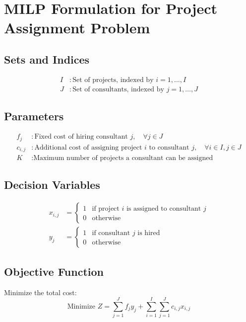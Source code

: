 \documentclass{article}
\begin{document}
\section*{MILP Formulation for Project Assignment Problem}

\subsection*{Sets and Indices}
\begin{align*}
I & : \text{Set of projects, indexed by } i = 1, \ldots, I \\
J & : \text{Set of consultants, indexed by } j = 1, \ldots, J
\end{align*}

\subsection*{Parameters}
\begin{align*}
f_j & : \text{Fixed cost of hiring consultant } j, \quad \forall j \in J \\
c_{i,j} & : \text{Additional cost of assigning project } i \text{ to consultant } j, \quad \forall i \in I, j \in J \\
K & : \text{Maximum number of projects a consultant can be assigned}
\end{align*}

\subsection*{Decision Variables}
\begin{align*}
x_{i,j} & = 
\begin{cases} 
1 & \text{if project } i \text{ is assigned to consultant } j \\ 
0 & \text{otherwise} 
\end{cases} \\
y_j & = 
\begin{cases} 
1 & \text{if consultant } j \text{ is hired} \\ 
0 & \text{otherwise}
\end{cases}
\end{align*}

\subsection*{Objective Function}
Minimize the total cost:
\[
\text{Minimize } Z = \sum_{j=1}^{J} f_j y_j + \sum_{i=1}^{I} \sum_{j=1}^{J} c_{i,j} x_{i,j}
\]
\end{document}
